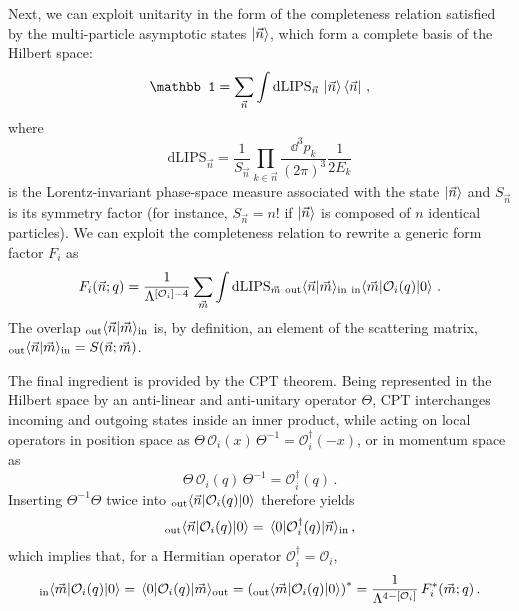 Next, we can exploit unitarity in the form of the completeness relation satisfied by the multi-particle asymptotic states $\ket{\vec n}$, which form a complete basis of the Hilbert space:
\begin{equation}
    \mathbb 1 = \sum_{\vec n} \int \text{dLIPS}_{\vec n}\, \ket{\vec n}\bra{\vec n}\,,
\end{equation}
where
\begin{equation}
    \text{dLIPS}_{\vec n} = \frac{1}{S_{\vec n}} \prod_{k\in \vec n}\frac{\dd^3 p_k}{(2\pi)^3}\frac{1}{2E_k}
\end{equation}
is the Lorentz-invariant phase-space measure associated with the state $\ket{\vec n}$ and $S_{\vec n}$ is its symmetry factor (for instance, $S_{\vec n} = n!$ if $\ket{\vec n}$ is composed of $n$ identical particles).
We can exploit the completeness relation to rewrite a generic form factor $F_i$ as
\begin{equation}\label{eq:partial3}
    F_i(\vec n;q) = \frac{1}{\Lambda^{[\mathcal O_i]-4}} \sum_{\vec m} \int \text{dLIPS}_{\vec m} \;{}_{\text{out}}\!\braket*{\vec n}{\vec m}\!{}_{\text{in}}\; {}_{\text{in}}\!\mel*{\vec m}{\mathcal O_i(q)}{0}\,.
\end{equation}
The overlap ${}_{\text{out}}\!\braket*{\vec n}{\vec m}\!{}_{\text{in}}$ is, by definition, an element
of the scattering matrix, ${}_{\text{out}}\!\braket*{\vec n}{\vec m}\!{}_{\text{in}} = S(\vec n ; \vec m)$.

The final ingredient is provided by the CPT theorem. 
Being represented in the Hilbert space by an anti-linear and anti-unitary operator $\Theta$, CPT
interchanges incoming and outgoing states inside an inner product, while acting on local operators in position space as
$\Theta\,\mathcal{O}_i(x)\,\Theta^{-1} = \mathcal{O}_i^\dagger(-x)$, or in momentum space as
\begin{equation}
    \Theta\,\mathcal O_i(q)\,\Theta^{-1} = \mathcal O_i^\dagger(q)\,.
\end{equation}
Inserting $\Theta^{-1}\Theta$ twice into ${}_{\text{out}}\!\mel*{\vec n}{\mathcal O_i(q)}{0}$
therefore yields
\begin{equation}\label{eq:RGECPT}
    {}_{\text{out}}\!\mel*{\vec n}{\mathcal O_i(q)}{0} = \mel*{0}{\mathcal O_i^\dagger(q)}{\vec n}\!{}_{\text{in}}\,,
\end{equation}
which implies that, for a Hermitian operator $\mathcal O_i^\dagger = \mathcal O_i$,
\begin{equation}
    {}_{\text{in}}\!\mel*{\vec m}{\mathcal O_i(q)}{0} = \mel*{0}{\mathcal O_i(q)}{\vec m}\!{}_{\text{out}} = \left({}_{\text{out}}\!\mel*{\vec m}{\mathcal O_i(q)}{0}\right)^* = \frac{1}{\Lambda^{4-[\mathcal O_i]}} \, F_i^*(\vec m;q)\,.
\end{equation}

